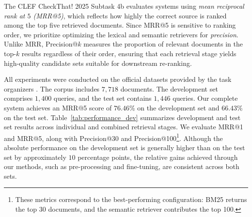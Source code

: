 %
%
The CLEF CheckThat! 2025 Subtask 4b evaluates systems using \emph{mean reciprocal rank at $5$ (MRR@5)}, which reflects how highly the correct source is ranked among the top five retrieved documents. Since MRR@5 is sensitive to ranking order, we prioritize optimizing the lexical and semantic retrievers for \emph{precision}.
Unlike MRR, Precision@$k$ measures the proportion of relevant documents in the top-$k$ results regardless of their order, ensuring that each retrieval stage yields high-quality candidate sets suitable for downstream re-ranking.

All experiments were conducted on the official datasets provided by the task organizers \cite{clef-checkthat:2025:task4}. The corpus includes $7,718$ documents. The development set comprises $1,400$ queries, and the test set contains $1,446$ queries.
Our complete system achieves an MRR@5 score of $76.46$\% on the development set and $66.43$\% on the test set.
Table~\ref{tab:performance_dev} summarizes development and test set results across individual and combined retrieval stages. We evaluate MRR@1 and MRR@5, along with Precision@30 and Precision@100\footnote{These metrics correspond to the best-performing configuration: BM25 returns the top 30 documents, and the semantic retriever contributes the top 100.}.
Although the absolute performance on the development set is generally higher than on the test set by approximately $10$ percentage points, the relative gains achieved through our methods, such as pre-processing and fine-tuning, are consistent across both sets.
%
